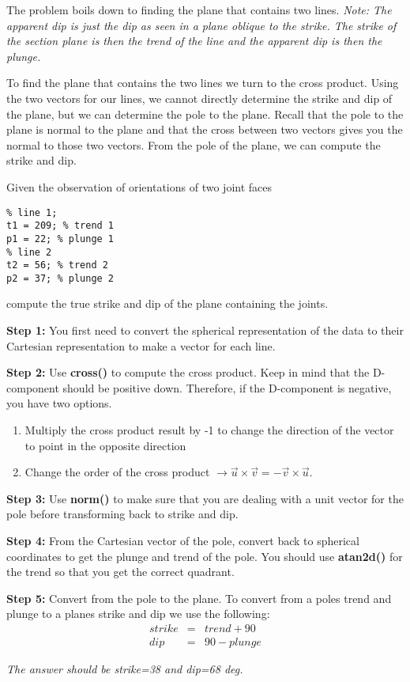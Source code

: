 \documentclass[10pt,fleqn]{article}
\begin{document}
The problem boils down to finding the plane that contains two lines.
\textit{Note: The apparent dip is just the dip as seen in a plane oblique to the strike. The strike of the section plane is then the trend of the line and the apparent dip is then the plunge.}

To find the plane that contains the two lines we turn to the cross product. Using the two vectors for our lines, we cannot directly determine the strike and dip of the plane, but we can determine the pole to the plane. Recall that the pole to the plane is normal to the plane and that the cross between two vectors gives you the normal to those two vectors. From the pole of the plane, we can compute the strike and dip.

Given the observation of orientations of two joint faces
\begin{lstlisting}
% line 1;
t1 = 209; % trend 1
p1 = 22; % plunge 1
% line 2
t2 = 56; % trend 2
p2 = 37; % plunge 2
\end{lstlisting}
compute the true strike and dip of the plane containing the joints.

\textbf{Step 1:}
You first need to convert the spherical representation of the data to their Cartesian representation to make a vector for each line.

\textbf{Step 2:}
Use \textbf{cross()} to compute the cross product. Keep in mind that the D-component should be positive down. Therefore, if the D-component is negative, you have two options.
\begin{enumerate}
  \item Multiply the cross product result by -1 to change the direction of the vector to point in the opposite direction
  \item Change the order of the cross product $\rightarrow \vec{u}\times \vec{v} = - \vec{v}\times\vec{u}$. 
\end{enumerate}

\textbf{Step 3:}
Use \textbf{norm()} to make sure that you are dealing with a unit vector for the pole before transforming back to strike and dip.

\textbf{Step 4:}
From the Cartesian vector of the pole, convert back to spherical coordinates to get the plunge and trend of the pole. You should use \textbf{atan2d()} for the trend so that you get the correct quadrant.

\textbf{Step 5:}
Convert from the pole to the plane. To convert from a poles trend and plunge to a planes strike and dip we use the following:
\begin{eqnarray} \nonumber
  strike &=& trend + 90 \\ \nonumber
  dip &=& 90 -  plunge
\end{eqnarray}

\textit{The answer should be strike=38 and dip=68 deg.}
\end{document}
